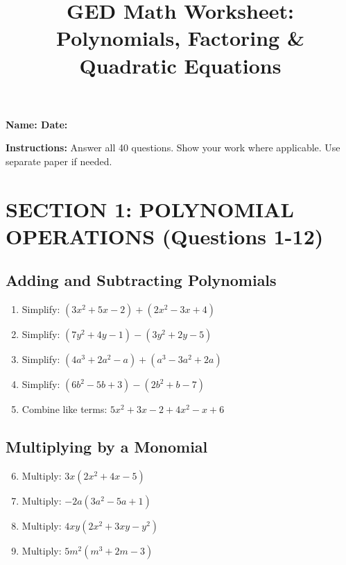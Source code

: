\documentclass[12pt]{article}
\title{\textbf{GED Math Worksheet: Polynomials, Factoring \& Quadratic Equations}}
\author{}
\date{}
\begin{document}
\maketitle

\noindent
\textbf{Name: \underline{\hspace{3cm}}} \hspace{2cm} \textbf{Date: \underline{\hspace{3cm}}}

\vspace{0.3cm}
\noindent
\textbf{Instructions:} Answer all 40 questions. Show your work where applicable. Use separate paper if needed.

\hrulefill

\section*{SECTION 1: POLYNOMIAL OPERATIONS (Questions 1-12)}

\subsection*{Adding and Subtracting Polynomials}

\begin{enumerate}
\item Simplify: $(3x^2 + 5x - 2) + (2x^2 - 3x + 4)$

\item Simplify: $(7y^2 + 4y - 1) - (3y^2 + 2y - 5)$

\item Simplify: $(4a^3 + 2a^2 - a) + (a^3 - 3a^2 + 2a)$

\item Simplify: $(6b^2 - 5b + 3) - (2b^2 + b - 7)$

\item Combine like terms: $5x^2 + 3x - 2 + 4x^2 - x + 6$
\end{enumerate}

\subsection*{Multiplying by a Monomial}

\begin{enumerate}
\setcounter{enumi}{5}
\item Multiply: $3x(2x^2 + 4x - 5)$

\item Multiply: $-2a(3a^2 - 5a + 1)$

\item Multiply: $4xy(2x^2 + 3xy - y^2)$

\item Multiply: $5m^2(m^3 + 2m - 3)$
\end{enumerate}
\end{document}
